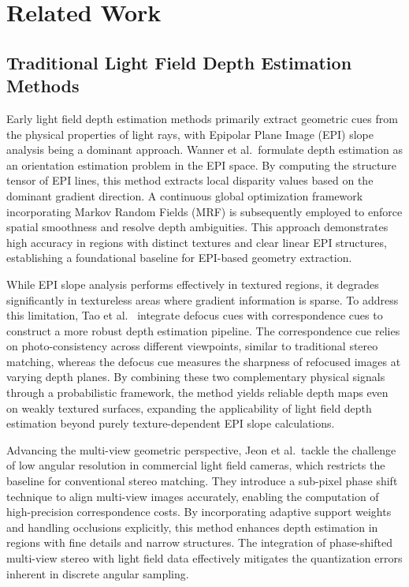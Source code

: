 \documentclass[lettersize,journal]{IEEEtran}
\begin{document}
\section{Related Work}

\subsection{Traditional Light Field Depth Estimation Methods}

Early light field depth estimation methods primarily extract geometric cues from the physical properties of light rays, with Epipolar Plane Image (EPI) slope analysis being a dominant approach. Wanner et al.~formulate depth estimation as an orientation estimation problem in the EPI space. By computing the structure tensor of EPI lines, this method extracts local disparity values based on the dominant gradient direction. A continuous global optimization framework incorporating Markov Random Fields (MRF) is subsequently employed to enforce spatial smoothness and resolve depth ambiguities. This approach demonstrates high accuracy in regions with distinct textures and clear linear EPI structures, establishing a foundational baseline for EPI-based geometry extraction.

While EPI slope analysis performs effectively in textured regions, it degrades significantly in textureless areas where gradient information is sparse. To address this limitation, Tao et al.~\cite{honauer2016} integrate defocus cues with correspondence cues to construct a more robust depth estimation pipeline. The correspondence cue relies on photo-consistency across different viewpoints, similar to traditional stereo matching, whereas the defocus cue measures the sharpness of refocused images at varying depth planes. By combining these two complementary physical signals through a probabilistic framework, the method yields reliable depth maps even on weakly textured surfaces, expanding the applicability of light field depth estimation beyond purely texture-dependent EPI slope calculations.

Advancing the multi-view geometric perspective, Jeon et al.~tackle the challenge of low angular resolution in commercial light field cameras, which restricts the baseline for conventional stereo matching. They introduce a sub-pixel phase shift technique to align multi-view images accurately, enabling the computation of high-precision correspondence costs. By incorporating adaptive support weights and handling occlusions explicitly, this method enhances depth estimation in regions with fine details and narrow structures. The integration of phase-shifted multi-view stereo with light field data effectively mitigates the quantization errors inherent in discrete angular sampling.
\end{document}
